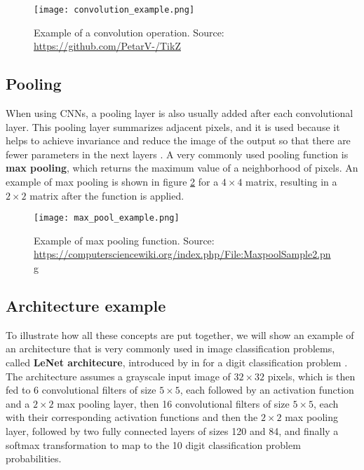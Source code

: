 
\begin{figure}[H]
    \centering
    \texttt{[image: convolution\_example.png]}
    \caption{Example of a convolution operation. Source: \url{https://github.com/PetarV-/TikZ}}
    \label{fig:conv_example}
\end{figure}

\subsection{Pooling}

When using CNNs, a pooling layer is also usually added after each convolutional layer. This pooling layer summarizes adjacent pixels, and it is used because it helps to achieve invariance and reduce the image of the output so that there are fewer parameters in the next layers \cite{bengio2015deep}. A very commonly used pooling function is \textbf{max pooling}, which returns the maximum value of a neighborhood of pixels. An example of max pooling is shown in figure \ref{fig:max_pool_example} for a $4 \times 4$ matrix, resulting in a $2 \times 2$ matrix after the function is applied.

\begin{figure}[H]
    \centering
    \texttt{[image: max\_pool\_example.png]}
    \caption{Example of max pooling function. Source: \url{https://computersciencewiki.org/index.php/File:MaxpoolSample2.png}}
    \label{fig:max_pool_example}
\end{figure}


\subsection{Architecture example}

To illustrate how all these concepts are put together, we will show an example of an architecture that is very commonly used in image classification problems, called \textbf{LeNet architecure}, introduced by \citeauthor{lecun1998gradient} in \citeyear{lecun1998gradient} for a digit classification problem \cite{lecun1998gradient}. The architecture assumes a grayscale input image of $32 \times 32$ pixels, which is then fed to 6 convolutional filters of size $5 \times 5$, each followed by an activation function and a $2 \times 2$ max pooling layer, then 16 convolutional filters of size $5 \times 5$, each with their corresponding activation functions and then the $2 \times 2$ max pooling layer, followed by two fully connected layers of sizes 120 and 84, and finally a softmax transformation to map to the 10 digit classification problem probabilities.

